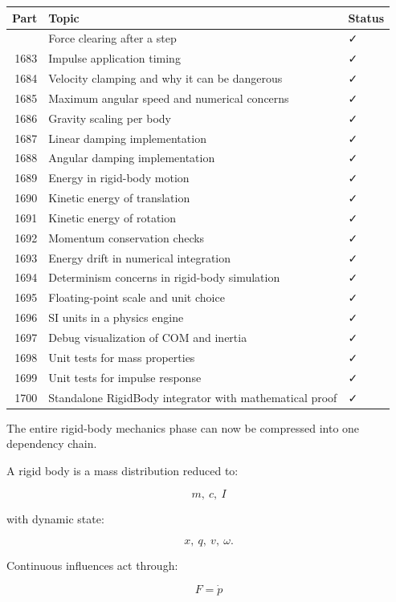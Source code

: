 {\def\LTcaptype{none} %
\begin{longtable}[]{@{}rll@{}}
\toprule\noalign{}
Part & Topic & Status \\
\midrule\noalign{}
\endhead
\bottomrule\noalign{}
\endlastfoot
1682 & Force clearing after a step & ✓ \\
1683 & Impulse application timing & ✓ \\
1684 & Velocity clamping and why it can be dangerous & ✓ \\
1685 & Maximum angular speed and numerical concerns & ✓ \\
1686 & Gravity scaling per body & ✓ \\
1687 & Linear damping implementation & ✓ \\
1688 & Angular damping implementation & ✓ \\
1689 & Energy in rigid-body motion & ✓ \\
1690 & Kinetic energy of translation & ✓ \\
1691 & Kinetic energy of rotation & ✓ \\
1692 & Momentum conservation checks & ✓ \\
1693 & Energy drift in numerical integration & ✓ \\
1694 & Determinism concerns in rigid-body simulation & ✓ \\
1695 & Floating-point scale and unit choice & ✓ \\
1696 & SI units in a physics engine & ✓ \\
1697 & Debug visualization of COM and inertia & ✓ \\
1698 & Unit tests for mass properties & ✓ \\
1699 & Unit tests for impulse response & ✓ \\
1700 & Standalone RigidBody integrator with mathematical proof & ✓ \\
\end{longtable}
}

The entire rigid-body mechanics phase can now be compressed into one dependency chain.

A rigid body is a mass distribution reduced to:

\[
\boxed{
m,\ c,\ I
}
\]

with dynamic state:

\[
\boxed{
x,\ q,\ v,\ \omega.
}
\]

Continuous influences act through:

\[
\boxed{
F=\dot p
}
\]

